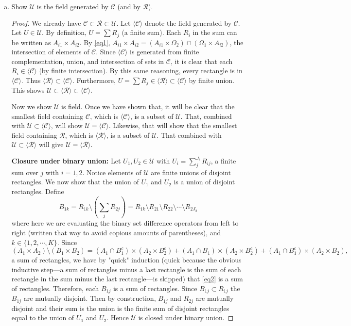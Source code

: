 \documentclass[letterpaper, 12pt]{article}
\newcommand{\cC}{\mathcal{C}}
\newcommand{\cR}{\mathcal{R}}
\newcommand{\cU}{\mathcal{U}}
\begin{document}
\begin{enumerate}
\begin{enumerate}[(a)]
\begin{proof}
\end{proof}
\item
Show $\cU$ is the field generated by $\cC$ (and by $\cR$).
\begin{proof}
We already have $\cC \subset \cR \subset \cU$.
Let $\langle \cC \rangle$ denote the field generated by $\cC$.
Let $U \in \cU$. 
By definition, $U = \sum R_j$ (a finite sum).
Each $R_i$ in the sum can be written as $A_{i1} \times A_{i2}$. 
By \eqref{eq1}, $A_{i1} \times A_{i2} = (A_{i1} \times \Omega_2) \cap (\Omega_1 \times A_{i2})$, the intersection of elements of $\cC$. 
Since $\langle \cC \rangle$ is generated from finite complementation, union, and intersection of sets in $\cC$, it is clear that each $R_i \in \langle \cC \rangle$ (by finite intersection). 
By this same reasoning, every rectangle is in $\langle \cC \rangle$. 
Thus $\langle \cR \rangle \subset \langle \cC \rangle$.
Furthermore, $U = \sum R_j \in \langle \cR \rangle \subset \langle \cC \rangle$ by finite union. 
This shows $\cU \subset \langle \cR \rangle \subset \langle \cC \rangle$. 

Now we show $\cU$ is field. 
Once we have shown that, it will be clear that the smallest field containing $\cC$, which is $\langle \cC \rangle$, is a subset of $\cU$. 
That, combined with $\cU \subset \langle \cC \rangle$, will show $\cU = \langle \cC \rangle$. 
Likewise, that will show that the smallest field containing $\cR$, which is $\langle \cR \rangle$, is a subset of $\cU$. 
That combined with $\cU \subset \langle \cR \rangle$ will give $\cU =\langle \cR \rangle$.

\textbf{Closure under binary union:} Let $U_1, U_2 \in \cU$ with $U_i = \sum_j^{J_i} R_{ij}$, a finite sum over $j$ with $i = 1,2$. 
Notice elements of $\cU$ are finite unions of disjoint rectangles. 
We now show that the union of $U_1$ and $U_2$ is a union of disjoint rectangles. 
Define 
\begin{equation}
\label{eq2}
B_{1k} = R_{1k} \setminus (\sum_j R_{2j}) = R_{1k} \setminus R_{21} \setminus R_{22} \setminus \cdots \setminus R_{2J_2}
\end{equation}
where here we are evaluating the binary set difference operators from left to right (written that way to avoid copious amounts of  parentheses), and $k \in \{1, 2, \cdots, K\}$. 
Since 
\[
(A_1 \times A_2) \setminus (B_1 \times B_2) = (A_1 \cap B_1^c) \times (A_2 \times B_2^c) + (A_1 \cap B_1) \times (A_2 \times B_2^c) + (A_1 \cap B_1^c) \times (A_2 \times B_2)
\text{,}
\]
a sum of rectangles, we have by "quick" induction (quick because the obvious inductive step---a sum of rectangles minus a last rectangle is the sum of each rectangle in the sum minus the last rectangle---is skipped) that \eqref{eq2} is a sum of rectangles. 
Therefore, each $B_{1j}$ is a sum of rectangles. 
Since $B_{1j} \subset R_{1j}$ the $B_{1j}$ are mutually disjoint. 
Then by construction, $B_{1j}$ and $R_{2j}$ are mutually disjoint and their sum is the union is the finite sum of disjoint rectangles equal to the union of $U_1$ and $U_2$. 
Hence $\cU$ is closed under binary union.


\end{proof}
\end{enumerate}
\end{enumerate}
\end{document}
